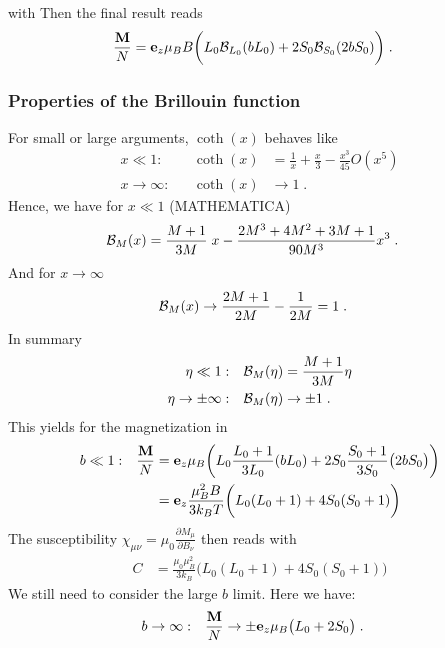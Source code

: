 %
%
with
Then the final result reads
%
\begin{align}
\frac{\mathbf M}{N}
&= \mathbf e_{z} \mu_{B} B
\bigg(  
L_{0} {\cal B}_{L_{0}}(b L_{0})
+
2S_{0} {\cal B}_{S_{0}}(2b S_{0} )
\bigg)\;.\label{eq:para:5}
\end{align}
%
\subsubsection{Properties of the Brillouin function}
For small or large arguments, $\coth(x)$ behaves like
%
\begin{align*}
x\ll 1:&&\coth(x) &= \frac{1}{x} + \frac{x}{3} -\frac{x^{3}}{45} O(x^{5})\\
x\to \infty:&&\coth(x) &\to  1\;.
\end{align*}
%
Hence, we have for $x\ll 1$ (MATHEMATICA)
\begin{align}\label{eq:bernoulli:series}
{\cal B}_{M}(x) 
&=\frac{M+1}{3 M}\; x -\frac{2M^{3}+4M^{2}+3M+1}{90 M^{3}} x^{3}\;.
\end{align}
%
And for $x\to \infty$ 
%
\begin{align*}
{\cal B}_{M}(x) &\to \frac{2M+1}{2M} - \frac{1}{2M} = 1\;. 
\end{align*}
%
In summary
%
\begin{align*}
\eta\ll 1:&&{\cal B}_{M}(\eta)&= \frac{M+1}{3 M} \eta\\
\eta\to \pm\infty:&&{\cal B}_{M}(\eta)&\to  \pm 1\;.
\end{align*}
%
This yields for the magnetization in 
%
\begin{align*}
b\ll 1:&&\frac{\mathbf M}{N}
&= \mathbf e_{z} \mu_{B}
\bigg(  
L_{0} \frac{L_{0}+1}{3 L_{0}} (b L_{0})
+
2S_{0}  \frac{S_{0}+1}{3S_{0}} 
\big( 2 b S_{0} \big)
\bigg) \\
&&&= \mathbf e_{z} \frac{ \mu_{B}^{2} B}{3 k_{B}T}
\bigg(  
L_{0}(L_{0}+1)
+
4 S_{0}  (S_{0}+1)
\bigg) \;
\end{align*}
%
The susceptibility $\chi_{\mu\nu} = \mu_0 \frac{\partial M_\mu}{\partial B_\nu}$ then reads
%
%
with 
%
\begin{align*}
C &= \frac{ \mu_{0}\mu_{B}^{2} }{3 k_{B}}
\bigg(  
L_{0}(L_{0}+1)
+
4 S_{0}  (S_{0}+1)
\bigg)
\end{align*}
%
We still need to consider the large $b$ limit. Here we have:
%
\begin{align*}
b\to \infty:&&\frac{\mathbf M}{N}
&\to \pm  \mathbf e_{z} \mu_{B}
\big(  L_{0} +2S_{0}\big) \;.
\end{align*}
%
